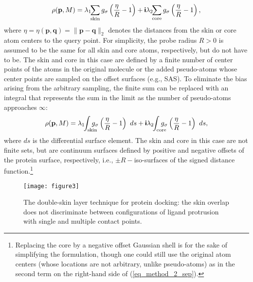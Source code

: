 \documentclass[article]{gmp2014}
\theoremstyle{definition}
\newcommand{\ii}{\text{\textsf{\textbf{i}}}}
\newcommand{\nquad}{\!\! \!\! \!\!}
\begin{document}
%
\begin{equation}
    \rho(\mathbf{p}, M) = \lambda_1 \!\! \sum_{\text{skin}} g_\sigma \left( \frac{\eta}{R} - 1 \right) + \ii \lambda_2 \!\! \sum_{\text{core}} g_\sigma \left( \frac{\eta}{R} - 1 \right), \label{eq_method_2_sep}
\end{equation}
%
where $\eta = \eta(\mathbf{p}, \mathbf{q}) = \| \mathbf{p} - \mathbf{q} \|_2$ denotes the distances from the skin or core atom centers to the query point.
%
For simplicity, the probe radius $R > 0$ is assumed to be the same for all skin and core atoms, respectively, but do not have to be.
%
The skin and core in this case are defined by a finite number of center points of the atoms in the original molecule or the added pseudo-atoms whose center points are sampled on the offset surfaces (e.g., SAS).
%
To eliminate the bias arising from the arbitrary sampling, the finite sum can be replaced with an integral that represents the sum in the limit as the number of pseudo-atoms approaches $\infty$:
%
\begin{equation}
    \rho(\mathbf{p}, M) = \lambda_1 \!\! \int_{\text{skin}} \nquad g_\sigma \left( \frac{\eta}{R} - 1 \right) ~ds + \ii \lambda_2 \!\! \int_{\text{core}} \nquad g_\sigma \left( \frac{\eta}{R} - 1 \right) ~ds, \label{eq_method_2_int}
\end{equation}
%
where $ds$ is the differential surface element. The skin and core in this case are not finite sets, but are continuum surfaces defined by positive and negative offsets of the protein surface, respectively, i.e., $\pm R-$iso-surfaces of the signed distance function.\footnote{Replacing the core by a negative offset Gaussian shell is for the sake of simplifying the formulation, though one could still use the original atom centers (whose locations are not arbitrary, unlike pseudo-atoms) as in the second term on the right-hand side of (\ref{eq_method_2_sep}).}

%
\begin{figure}
    \centering
    \texttt{[image: figure3]}
    \caption{The double-skin layer technique for protein docking: the skin overlap does not discriminate between configurations of ligand protrusion with single and multiple contact points.} \label{figure3}
\end{figure}
%
\end{document}
